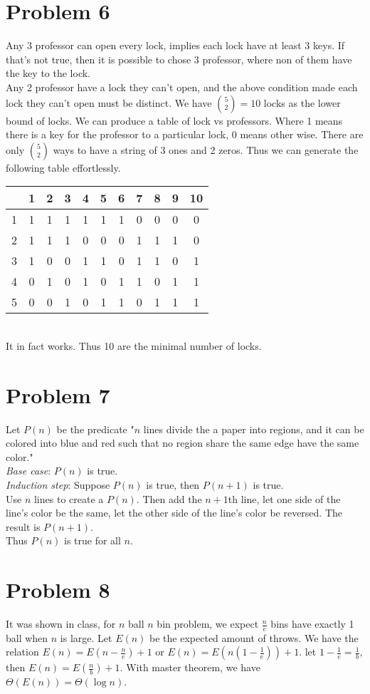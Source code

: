 \documentclass[letter]{article}
\begin{document}
\section*{Problem 6}
Any 3 professor can open every lock, implies each lock have at least 3 keys. If that's not true, then it is possible to chose 3 professor, where non of them have the key to the lock.\\
Any 2 professor have a lock they can't open, and the above condition made each lock they can't open must be distinct. We have ${5 \choose 2} = 10$ locks as the lower bound of locks.  We can produce a table of lock vs professors. Where 1 means there is a key for the professor to a particular lock, 0 means other wise. There are only ${5 \choose 2}$ ways to have a string of 3 ones and 2 zeros. Thus we can generate the following table effortlessly.\\
\begin{tabular}{l | c c c c c c c c c c}
 & 1  & 2 & 3 & 4 & 5 & 6 & 7 & 8 & 9 & 10\\
\hline
1& 1 & 1 & 1 & 1 & 1 & 1 & 0 & 0 & 0 & 0\\
2& 1 & 1 & 1 & 0 & 0 & 0 & 1 & 1 & 1 & 0\\
3& 1 & 0 & 0 & 1 & 1 & 0 & 1 & 1 & 0 & 1\\
4& 0 & 1 & 0 & 1 & 0 & 1 & 1 & 0 & 1 & 1\\
5& 0 & 0 & 1 & 0 & 1 & 1 & 0 & 1 & 1 & 1\\
\end{tabular}\\
It in fact works. Thus 10 are the minimal number of locks.

\section*{Problem 7}
Let $P(n)$ be the predicate "$n$ lines divide the a paper into regions, and it can be colored into blue and red such that no region share the same edge have the same color."\\
\emph{Base case}: $P(n)$ is true.\\
\emph{Induction step}: Suppose $P(n)$ is true, then $P(n+1)$ is true.\\
Use $n$ lines to create a $P(n)$. Then add the $n+1$th line, let one side of the line's color be the same, let the other side of the line's color be reversed. The result is $P(n+1)$.\\
Thus $P(n)$ is true for all $n$.

\section*{Problem 8}
It was shown in class, for $n$ ball $n$ bin problem, we expect $\frac{n}{e}$ bins have exactly 1 ball when $n$ is large. Let $E(n)$ be the expected amount of throws. We have the relation $E(n) = E(n-\frac{n}{e}) + 1$ or $E(n) = E(n(1-\frac{1}{e})) + 1$. let $1-\frac{1}{e} = \frac{1}{b}$, then $E(n) = E(\frac{n}{b}) + 1$. With master theorem, we have $\Theta(E(n)) = \Theta(\log n)$.
\end{document}

